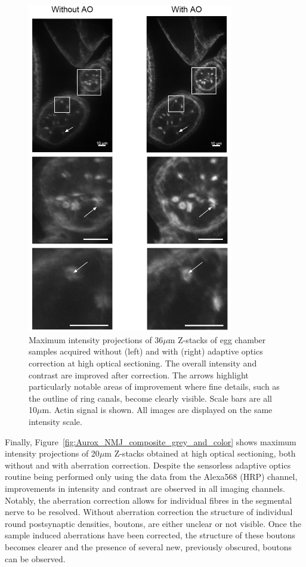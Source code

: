\begin{figure}[h]
	\centering
	\includegraphics[width=0.8\textwidth]{images/Aurox_egg_chambers_composite.jpg}
	\caption[\textit{Drosophila} egg chamber data acquired on the Aurox imaging 
	system]{Maximum intensity projections of 36$\mu$m Z-stacks of egg 
		chamber samples acquired without (left) and with (right) adaptive 
		optics correction at high optical sectioning. The overall intensity 
		and contrast are improved after correction. The arrows highlight 
		particularly notable areas of improvement where fine details, such 
		as the outline of ring canals, become clearly visible. Scale bars 
		are all 10$\mu$m. Actin signal is shown. All images are displayed 
		on the same intensity scale.}
	\label{fig:Aurox_egg_chambers_composite}
\end{figure}

Finally, Figure~\ref{fig:Aurox_NMJ_composite_grey_and_color} shows maximum 
intensity projections of 20$\mu$m Z-stacks obtained at high optical 
sectioning, both without and with aberration correction. Despite the 
sensorless adaptive optics routine being performed only using the data 
from the Alexa568 (HRP) channel, improvements in intensity and contrast
are observed in all imaging channels. Notably, the aberration correction 
allows for individual fibres in the segmental nerve to be resolved. Without
aberration correction the structure of individual round postsynaptic 
densities, boutons, are either unclear or not visible. Once the sample 
induced aberrations have been corrected, the structure of these boutons 
becomes clearer and the presence of several new, previously obscured, boutons 
can be observed.

